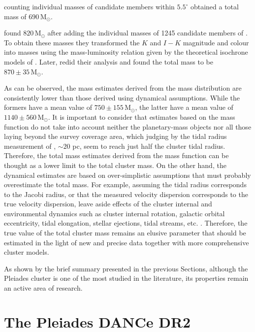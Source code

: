\citet{Adams2001} counting individual masses of candidate members within $5.5^{\circ}$ obtained a total mass of $690 \,\mathrm{M_{\odot}}$. 

\citet{Converse2008} found $820 \,\mathrm{M_{\odot}}$ after adding the individual masses of 1245  candidate members of \citet{Stauffer2007}. To obtain these masses they  transformed the $K$ and $I-K$ magnitude and colour into masses using the mass-luminosity relation given by the theoretical isochrone models of \citet{1998A&A...337..403B}. Later, \citet{Converse2010} redid their analysis and found the total mass to be $870\pm35\,\mathrm{M_{\odot}}$.

As can be observed, the mass estimates derived from the mass distribution are consistently lower than those derived using dynamical assumptions. While the formers have a mean value of $750\pm155\,\mathrm{M_{\odot}}$, the latter have a mean value of  $1140\pm560\,\mathrm{M_{\odot}}$. It is important to consider that estimates based on the mass function do not take into account neither the planetary-mass objects nor all those laying beyond the survey coverage area, which judging by the tidal radius measurement of \citet{Converse2010}, $\sim20$ pc, seem to reach just half the cluster tidal radius. Therefore, the total mass estimates derived from the mass function can be thought as a lower limit to the total cluster mass. On the other hand, the dynamical estimates are based on over-simplistic assumptions that must probably overestimate the total mass. For example, assuming the tidal radius corresponds to the Jacobi radius,  or  that the measured velocity dispersion corresponds to the true velocity dispersion, leave aside effects of the cluster internal and environmental dynamics such as cluster internal rotation, galactic orbital eccentricity, tidal elongation, stellar ejections, tidal streams,  etc. \cite[see for example][]{2010MNRAS.401..105K,2010MNRAS.407.2241K,2008gady.book.....B}. Therefore, the true value of the total cluster mass remains an elusive parameter that should be estimated in the light of new and precise data together with more comprehensive cluster models.

As shown by the brief summary presented in the previous Sections, although the Pleiades cluster is one of the most studied in the literature, its properties remain an active area of research.

\section{The Pleiades DANCe DR2}
\label{sect:DR2}

